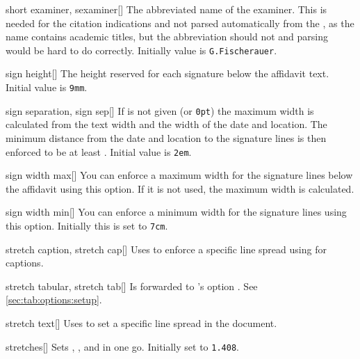 \begin{describeopt}{short examiner, sexaminer}[]
  The abbreviated name of the examiner. This is needed for the citation
  indications and not parsed automatically from the , as the name
  contains academic titles, but the abbreviation should not and parsing would be
  hard to do correctly. Initially value is \texttt{G.\@ Fischerauer}.
\end{describeopt}
\begin{describeopt}{sign height}[]
  The height reserved for each signature below the affidavit text. Initial value
  is \texttt{9mm}.
\end{describeopt}
\begin{describeopt}{sign separation, sign sep}[]
  If  is not given (or \texttt{0pt}) the maximum width is
  calculated from the text width and the width of the date and location. The
  minimum distance from the date and location to the signature lines is then
  enforced to be at least . Initial value is \texttt{2em}.
\end{describeopt}
\begin{describeopt}{sign width max}[]
  You can enforce a maximum width for the signature lines below the affidavit
  using this option. If it is not used, the maximum width is calculated.
\end{describeopt}
\begin{describeopt}{sign width min}[]
  You can enforce a minimum width for the signature lines using this option.
  Initially this is set to \texttt{7cm}.
\end{describeopt}
\begin{describeopt}{stretch caption, stretch cap}[]
  Uses  to enforce a specific line spread using 
  for captions.
\end{describeopt}
\begin{describeopt}{stretch tabular, stretch tab}[]
  Is forwarded to 's option . See
  \autoref{sec:tab:options:setup}.
\end{describeopt}
\begin{describeopt}{stretch text}[]
  Uses  to set a specific line spread in the document.
\end{describeopt}
\begin{describeopt}{stretches}[]
  Sets , , and  in one go.
  Initially set to \texttt{1.408}.
\end{describeopt}
